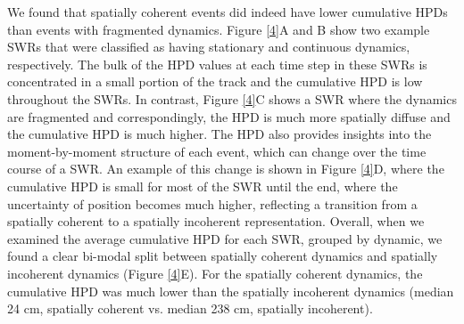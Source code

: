 \documentclass[times, twoside]{zHenriquesLab-StyleBioRxiv}
\begin{document}
We found that spatially coherent events did indeed have lower cumulative HPDs than events with fragmented dynamics. Figure \ref{4}A and B show two example SWRs that were classified as having stationary and continuous dynamics, respectively. The bulk of the HPD values at each time step in these SWRs is concentrated in a small portion of the track and the cumulative HPD is low throughout the SWRs. In contrast, Figure \ref{4}C shows a SWR where the dynamics are fragmented and correspondingly, the HPD is much more spatially diffuse and the cumulative HPD is much higher. The HPD also provides insights into the moment-by-moment structure of each event, which can change over the time course of a SWR. An example of this change is shown in Figure \ref{4}D, where the cumulative HPD is small for most of the SWR until the end, where the uncertainty of position becomes much higher, reflecting a transition from a spatially coherent to a spatially incoherent representation. Overall, when we examined the average cumulative HPD for each SWR, grouped by dynamic, we found a clear bi-modal split between spatially coherent dynamics and spatially incoherent dynamics (Figure \ref{4}E). For the spatially coherent dynamics, the cumulative HPD was much lower than the spatially incoherent dynamics (median 24 cm, spatially coherent vs. median 238 cm, spatially incoherent).
\end{document}

